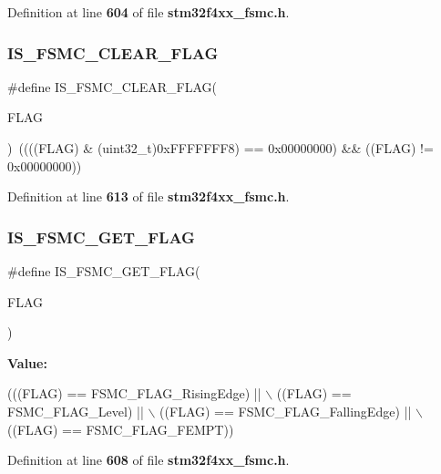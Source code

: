 Definition at line \textbf{ 604} of file \textbf{ stm32f4xx\+\_\+fsmc.\+h}.

\mbox{\label{group__FSMC__Flags_ga1114bf56b54e726831b38fc8c5daa14e}} 
\subsubsection{I\+S\+\_\+\+F\+S\+M\+C\+\_\+\+C\+L\+E\+A\+R\+\_\+\+F\+L\+AG}
{\footnotesize\ttfamily \#define I\+S\+\_\+\+F\+S\+M\+C\+\_\+\+C\+L\+E\+A\+R\+\_\+\+F\+L\+AG(\begin{DoxyParamCaption}\item[{}]{F\+L\+AG }\end{DoxyParamCaption})~((((F\+L\+AG) \& (uint32\+\_\+t)0x\+F\+F\+F\+F\+F\+F\+F8) == 0x00000000) \&\& ((\+F\+L\+A\+G) != 0x00000000))}



Definition at line \textbf{ 613} of file \textbf{ stm32f4xx\+\_\+fsmc.\+h}.

\mbox{\label{group__FSMC__Flags_gab8674160ef7884f939e07041bbf5b18b}} 
\subsubsection{I\+S\+\_\+\+F\+S\+M\+C\+\_\+\+G\+E\+T\+\_\+\+F\+L\+AG}
{\footnotesize\ttfamily \#define I\+S\+\_\+\+F\+S\+M\+C\+\_\+\+G\+E\+T\+\_\+\+F\+L\+AG(\begin{DoxyParamCaption}\item[{}]{F\+L\+AG }\end{DoxyParamCaption})}

{\bfseries Value\+:}
\begin{DoxyCode}
(((FLAG) == FSMC_FLAG_RisingEdge) || \(\backslash\)
                                ((FLAG) == FSMC_FLAG_Level) || \(\backslash\)
                                ((FLAG) == FSMC_FLAG_FallingEdge) || \(\backslash\)
                                ((FLAG) == FSMC_FLAG_FEMPT))
\end{DoxyCode}


Definition at line \textbf{ 608} of file \textbf{ stm32f4xx\+\_\+fsmc.\+h}.

